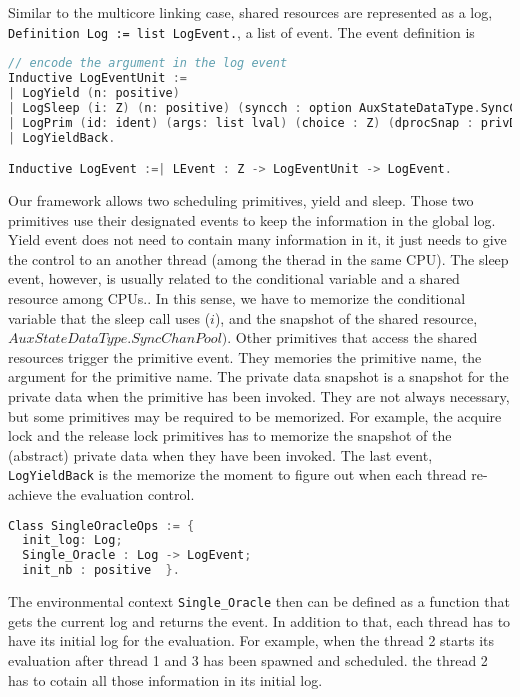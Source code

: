 Similar to the multicore linking case, 
shared resources are represented as a log, \lstinline$Definition Log := list LogEvent.$,  a list of event.
The event definition is 
\begin{lstlisting}[language=C]
// encode the argument in the log event
Inductive LogEventUnit :=
| LogYield (n: positive)
| LogSleep (i: Z) (n: positive) (syncch : option AuxStateDataType.SyncChanPool)
| LogPrim (id: ident) (args: list lval) (choice : Z) (dprocSnap : privDataSnap) 
| LogYieldBack.

Inductive LogEvent :=| LEvent : Z -> LogEventUnit -> LogEvent.
\end{lstlisting}
Our framework allows 
two scheduling primitives, 
yield and sleep. 
Those two primitives use their designated events to keep the information in the global log. 
Yield event does not need to contain many information in it, it just needs to give the control
to an another thread (among the therad in the same CPU). 
The sleep event, however, is usually related to the conditional variable and a shared resource among CPUs..
In this sense, we have to memorize the conditional variable that the sleep call uses ($i$),
and the snapshot of the shared resource, $AuxStateDataType.SyncChanPool)$.  
Other primitives that access the shared resources trigger the primitive event. 
They memories the primitive name, the argument for the primitive name. 
The private data snapshot is a snapshot for the private data when the primitive has been invoked. 
They are not always necessary, but some primitives may be required to be memorized. 
For example, the acquire lock and the release lock primitives 
has to memorize the snapshot of the (abstract) private data when they have been invoked. 
The last event, \lstinline$LogYieldBack$ is the memorize the 
moment to figure out when each thread re-achieve the evaluation control. 

\begin{lstlisting}[language=C]
Class SingleOracleOps := {
  init_log: Log;
  Single_Oracle : Log -> LogEvent;
  init_nb : positive  }.
\end{lstlisting}
The environmental context \lstinline$Single_Oracle$ 
then can be defined as a function that gets the current log and returns the event. 
In addition to that, 
each thread has to have its initial log 
for the evaluation. 
For example,
when the thread 2 starts its evaluation after 
thread 1 and 3 has been spawned and scheduled. 
the thread 2 has to cotain all those information in its initial log.

